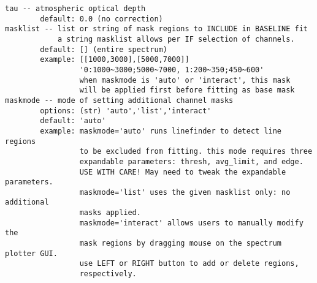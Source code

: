 \begin{verbatim}
tau -- atmospheric optical depth
        default: 0.0 (no correction)
masklist -- list or string of mask regions to INCLUDE in BASELINE fit
            a string masklist allows per IF selection of channels.
        default: [] (entire spectrum)
        example: [[1000,3000],[5000,7000]]
                 '0:1000~3000;5000~7000, 1:200~350;450~600'
                 when maskmode is 'auto' or 'interact', this mask 
                 will be applied first before fitting as base mask
maskmode -- mode of setting additional channel masks
        options: (str) 'auto','list','interact'
        default: 'auto'
        example: maskmode='auto' runs linefinder to detect line regions 
                 to be excluded from fitting. this mode requires three 
                 expandable parameters: thresh, avg_limit, and edge.
                 USE WITH CARE! May need to tweak the expandable parameters.
                 maskmode='list' uses the given masklist only: no additional 
                 masks applied.
                 maskmode='interact' allows users to manually modify the 
                 mask regions by dragging mouse on the spectrum plotter GUI.
                 use LEFT or RIGHT button to add or delete regions, 
                 respectively.
       

\end{verbatim}
